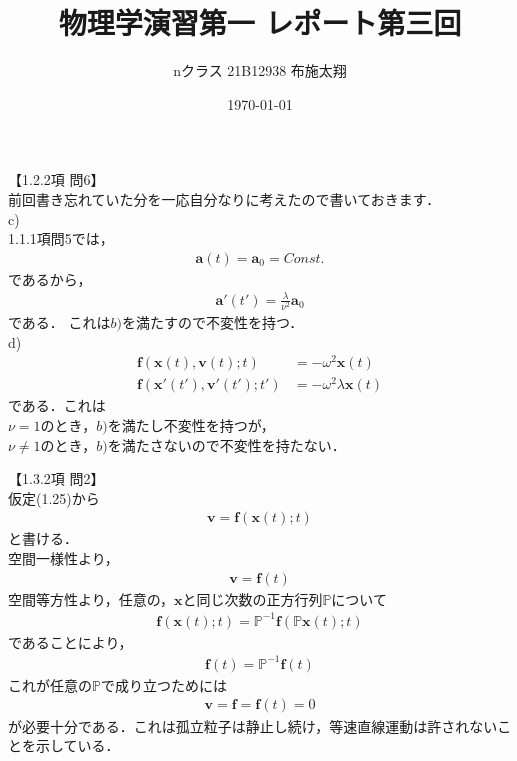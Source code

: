 \documentclass[dvipdfmx,uplatex,a4paper,11pt]{jsarticle}
\begin{document}
\title{物理学演習第一 レポート第三回}
\author{nクラス 21B12938 布施太翔}
\date{\today}
\maketitle
\newpage

【1.2.2項 問6】 \\
前回書き忘れていた分を一応自分なりに考えたので書いておきます．\\

c) \\
1.1.1項問5では，
\begin{align*}
  \bm{a}(t) = \bm{a}_0 = Const.
\end{align*}
であるから，
\begin{align*}
  \bm{a}'(t')=\frac{\lambda}{\nu^2}\bm{a}_0
\end{align*}
である．
これは$b)$を満たすので不変性を持つ．\\

d) \\
\begin{align*}
  \bm{f}(\bm{x}(t),\bm{v}(t);t)&=- \omega^2 \bm{x}(t) \\
  \bm{f}(\bm{x}'(t'),\bm{v}'(t');t')&=- \omega^2 \lambda \bm{x}(t)
\end{align*}
である．これは\\
$\nu=1$のとき，$b)$を満たし不変性を持つが，\\
$\nu \neq 1$のとき，$b)$を満たさないので不変性を持たない．\\

\newpage

【1.3.2項 問2】 \\

仮定(1.25)から
\begin{align*}
  \bm{v} = \bm{f}(\bm{x}(t);t)
\end{align*}
と書ける． \\
空間一様性より，
\begin{align*}
  \bm{v} = \bm{f}(t)
\end{align*}
空間等方性より，任意の，$\bm{x}$と同じ次数の正方行列$\mathbb{P}$について
\begin{align*}
  \bm{f}(\bm{x}(t);t) = \mathbb{P}^{-1} \bm{f}(\mathbb{P} \bm{x}(t);t)
\end{align*}
であることにより，
\begin{align*}
  \bm{f}(t) = \mathbb{P}^{-1} \bm{f}(t)
\end{align*}
これが任意の$\mathbb{P}$で成り立つためには
\begin{align*}
  \bm{v} = \bm{f} = \bm{f}(t) = 0
\end{align*}
が必要十分である．これは孤立粒子は静止し続け，等速直線運動は許されないことを示している． \\
\end{document}
